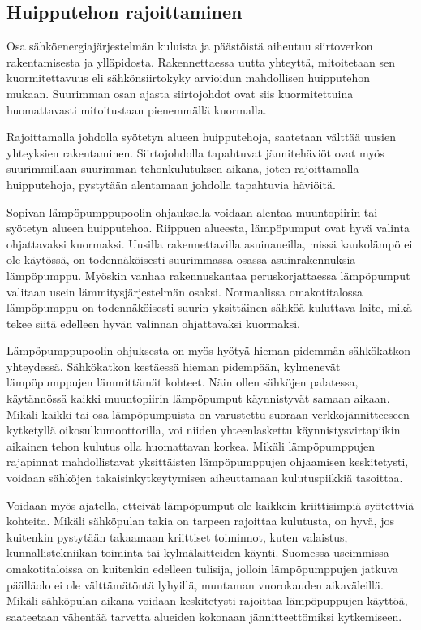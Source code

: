\subsection{Huipputehon rajoittaminen}

  Osa sähköenergiajärjestelmän kuluista ja päästöistä aiheutuu siirtoverkon rakentamisesta ja ylläpidosta. Rakennettaessa uutta yhteyttä, mitoitetaan sen kuormitettavuus eli sähkönsiirtokyky arvioidun mahdollisen huipputehon mukaan. Suurimman osan ajasta siirtojohdot ovat siis kuormitettuina huomattavasti mitoitustaan pienemmällä kuormalla.

  Rajoittamalla johdolla syötetyn alueen huipputehoja, saatetaan välttää uusien yhteyksien rakentaminen. Siirtojohdolla tapahtuvat jännitehäviöt ovat myös suurimmillaan suurimman tehonkulutuksen aikana, joten rajoittamalla huipputehoja, pystytään alentamaan johdolla tapahtuvia häviöitä.

  Sopivan lämpöpumppupoolin ohjauksella voidaan alentaa muuntopiirin tai syötetyn alueen huipputehoa. Riippuen alueesta, lämpöpumput ovat hyvä valinta ohjattavaksi kuormaksi. Uusilla rakennettavilla asuinaueilla, missä kaukolämpö ei ole käytössä, on todennäköisesti suurimmassa osassa asuinrakennuksia lämpöpumppu. Myöskin vanhaa rakennuskantaa peruskorjattaessa lämpöpumput valitaan usein lämmitysjärjestelmän osaksi. Normaalissa omakotitalossa lämpöpumppu on todennäköisesti suurin yksittäinen sähköä kuluttava laite, mikä tekee siitä edelleen hyvän valinnan ohjattavaksi kuormaksi.

  Lämpöpumppupoolin ohjuksesta on myös hyötyä hieman pidemmän sähkökatkon yhteydessä. Sähkökatkon kestäessä hieman pidempään, kylmenevät lämpöpumppujen lämmittämät kohteet. Näin ollen sähköjen palatessa, käytännössä kaikki muuntopiirin lämpöpumput käynnistyvät samaan aikaan. Mikäli kaikki tai osa lämpöpumpuista on varustettu suoraan verkkojännitteeseen kytketyllä oikosulkumoottorilla, voi niiden yhteenlaskettu käynnistysvirtapiikin aikainen tehon kulutus olla huomattavan korkea. Mikäli lämpöpumppujen rajapinnat mahdollistavat yksittäisten lämpöpumppujen ohjaamisen keskitetysti, voidaan sähköjen takaisinkytkeytymisen aiheuttamaan kulutuspiikkiä tasoittaa.

  Voidaan myös ajatella, etteivät lämpöpumput ole kaikkein kriittisimpiä syötettviä kohteita. Mikäli sähköpulan takia on tarpeen rajoittaa kulutusta, on hyvä, jos kuitenkin pystytään takaamaan kriittiset toiminnot, kuten valaistus, kunnallistekniikan toiminta tai kylmälaitteiden käynti. Suomessa useimmissa omakotitaloissa on kuitenkin edelleen tulisija, jolloin lämpöpumppujen jatkuva päälläolo ei ole välttämätöntä lyhyillä, muutaman vuorokauden aikaväleillä. Mikäli sähköpulan aikana voidaan keskitetysti rajoittaa lämpöpuppujen käyttöä, saateetaan vähentää tarvetta alueiden kokonaan jännitteettömiksi kytkemiseen.

